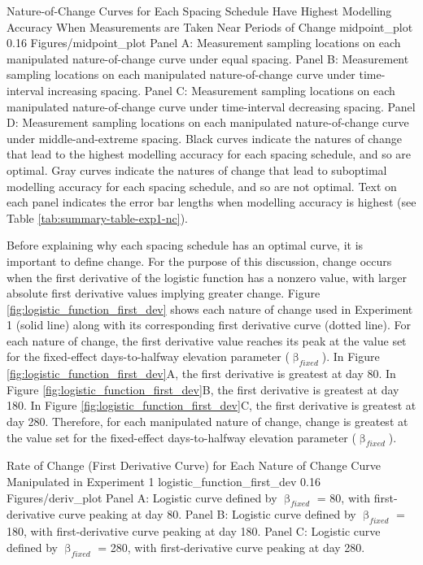 \documentclass[
12pt, %
twoside,
english]{guelphthesis}
\newcommand{\setMainMatterLinespacing}{
 \setstretch{2} %

        \setstretch{2}
  }
\let\oldRestoreGeometry\restoregeometry
\renewcommand{\restoregeometry}{
  \oldRestoreGeometry

  \setMainMatterLinespacing
}
\theoremstyle{definition}
\theoremstyle{definition}
\theoremstyle{definition}
\theoremstyle{definition}
\theoremstyle{remark}
\begin{document}
\restoregeometry
\begin{apaFigure}
[portrait]
[samepage]
[0cm]
{Nature-of-Change Curves for Each Spacing Schedule Have Highest Modelling Accuracy When Measurements are Taken Near Periods of Change}
{midpoint_plot}
{0.16}
{Figures/midpoint_plot}
{Panel A: Measurement sampling locations on each manipulated nature-of-change curve under equal spacing. Panel B: Measurement sampling locations on each manipulated nature-of-change curve under time-interval increasing spacing. Panel C: Measurement sampling locations on each manipulated nature-of-change curve under time-interval decreasing spacing. Panel D: Measurement sampling locations on each manipulated nature-of-change curve under middle-and-extreme spacing. Black curves indicate the natures of change that lead to the highest modelling accuracy for each spacing schedule, and so are optimal. Gray curves indicate the natures of change that lead to suboptimal modelling accuracy for each spacing schedule, and so are not optimal. Text on each panel indicates the error bar lengths when modelling accuracy is highest (see Table \ref{tab:summary-table-exp1-nc}).}
\end{apaFigure}
Before explaining why each spacing schedule has an optimal curve, it is important to define change. For the purpose of this discussion, change occurs when the first derivative of the logistic function has a nonzero value, with larger absolute first derivative values implying greater change. Figure \ref{fig:logistic_function_first_dev} shows each nature of change used in Experiment 1 (solid line) along with its corresponding first derivative curve (dotted line). For each nature of change, the first derivative value reaches its peak at the value set for the fixed-effect days-to-halfway elevation parameter (\(\upbeta_{fixed}\)). In Figure \ref{fig:logistic_function_first_dev}A, the first derivative is greatest at day 80. In Figure \ref{fig:logistic_function_first_dev}B, the first derivative is greatest at day 180. In Figure \ref{fig:logistic_function_first_dev}C, the first derivative is greatest at day 280. Therefore, for each manipulated nature of change, change is greatest at the value set for the fixed-effect days-to-halfway elevation parameter (\(\upbeta_{fixed}\)).
\begin{apaFigure}
[portrait]
[samepage]
[0cm]
{Rate of Change (First Derivative Curve) for Each Nature of Change Curve Manipulated in Experiment 1}
{logistic_function_first_dev}
{0.16}
{Figures/deriv_plot}
{Panel A: Logistic curve defined by $\upbeta_{fixed}$ = 80, with first-derivative curve peaking at day 80. Panel B: Logistic curve defined by $\upbeta_{fixed}$ = 180, with first-derivative curve peaking at day 180. Panel C: Logistic curve defined by $\upbeta_{fixed}$ = 280, with first-derivative curve peaking at day 280.}
\end{apaFigure}
\end{document}

